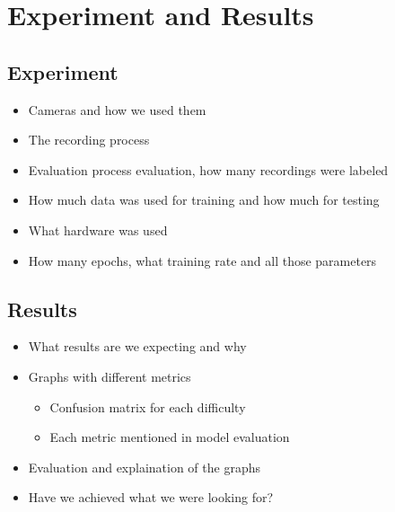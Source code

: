 \chapter{Experiment and Results}

\section{Experiment}
\label{sec:experiment}

\begin{itemize}
  \item Cameras and how we used them
  \item The recording process
  \item Evaluation process evaluation, how many recordings were labeled
  \item How much data was used for training and how much for testing
  \item What hardware was used
  \item How many epochs, what training rate and all those parameters
\end{itemize}

\section{Results}

\begin{itemize}
  \item What results are we expecting and why
  \item Graphs with different metrics
  
\begin{itemize}
    \item Confusion matrix for each difficulty
    \item Each metric mentioned in model evaluation
\end{itemize}

  \item Evaluation and explaination of the graphs
  \item Have we achieved what we were looking for?
\end{itemize}

